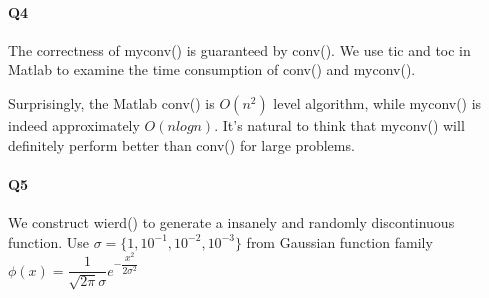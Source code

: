 \documentclass[11pt]{article}
\begin{document}
\paragraph{Q4}
The correctness of myconv() is guaranteed by conv(). We use tic and toc in Matlab to examine the time consumption of conv() and myconv().
\begin{figure}[H]
	\centering
\end{figure}
Surprisingly, the Matlab conv() is $O(n^2)$ level algorithm, while myconv() is indeed approximately $O(nlogn)$. It's natural to think that myconv() will definitely perform better than conv() for large problems.
\paragraph{Q5}
We construct wierd() to generate a insanely and randomly discontinuous function. Use $\sigma=\{1,10^{-1},10^{-2},10^{-3}\}$ from Gaussian function family $\phi(x)=\dfrac{1}{\sqrt{2\pi}\sigma}e^{-\dfrac{x^2}{2\sigma^2}}$
\begin{figure}[H]
	\centering
\end{figure}
\end{document}
